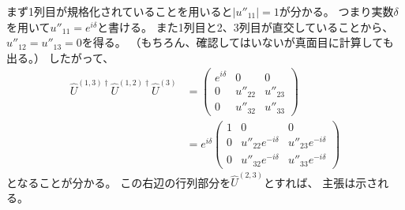 \documentclass[a4paper, 10pt]{jsarticle}
\begin{document}
\begin{problem}
	まず1列目が規格化されていることを用いると$|u''_{11}| = 1$が分かる。
	つまり実数$\delta$を用いて$u''_{11} = e^{i\delta}$と書ける。
	また1列目と2、3列目が直交していることから、
	$u''_{12} = u''_{13} = 0$を得る。
	（もちろん、確認してはいないが真面目に計算しても出る。）
	したがって、
	\begin{align}
		\hat{U}^{(1,3)\dagger} \hat{U}^{(1,2)\dagger} \hat{U}^{(3)}
		&= \left( \begin{array}{ccc}
			e^{i\delta} &0 & 0 \\
			0 & u''_{22} & u''_{23} \\
			0 & u''_{32} & u''_{33}
		\end{array} \right) \\
		&= e^{i\delta} \left( \begin{array}{ccc}
			1 &0 & 0 \\
			0 & u''_{22}e^{-i\delta} & u''_{23}e^{-i\delta} \\
			0 & u''_{32}e^{-i\delta} & u''_{33}e^{-i\delta}
		\end{array} \right)
	\end{align}
	となることが分かる。
	この右辺の行列部分を$\hat{U}^{(2,3)}$とすれば、
	主張は示される。
	

\end{problem}
\end{document}
